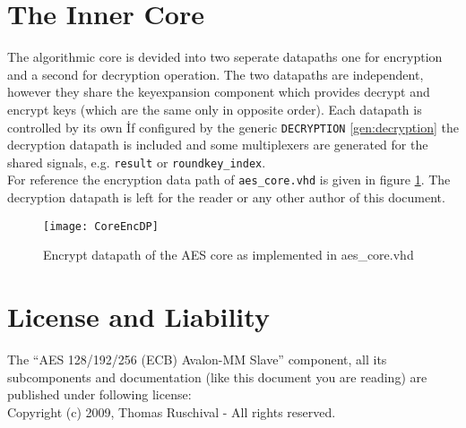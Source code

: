 \documentclass{ruschidoc}
\begin{document}
\section{The Inner Core}
\label{sec:core}
The algorithmic core is devided into two seperate datapaths one for encryption and a
second for decryption operation. The two datapaths are independent, however they
share the keyexpansion component which provides decrypt and encrypt keys (which are
the same only in opposite order). Each datapath is controlled by its own \FSM\.  If
configured by the generic \texttt{DECRYPTION} \ref{gen:decryption} the decryption
datapath is included and some multiplexers are generated for the shared signals,
e.g. \texttt{result} or \texttt{roundkey\_index}.\\
For reference the encryption data path of \texttt{aes\_core.vhd} is given in figure
\ref{fig:aescore}. The decryption datapath is left for the reader or any other author
of this document.
\begin{figure}[!ht]
  \centering
  \texttt{[image: CoreEncDP]}
  \caption{Encrypt datapath of the AES core as implemented in aes\_core.vhd}
  \label{fig:aescore}
\end{figure}


\newpage
\section{License and Liability}
\label{sec:license}
The ``AES 128/192/256 (ECB) Avalon\rtm-MM Slave'' component, all its subcomponents
and documentation (like this document you are reading) are published under following
license:\\

Copyright (c) 2009, Thomas Ruschival - All rights reserved.
\end{document}
